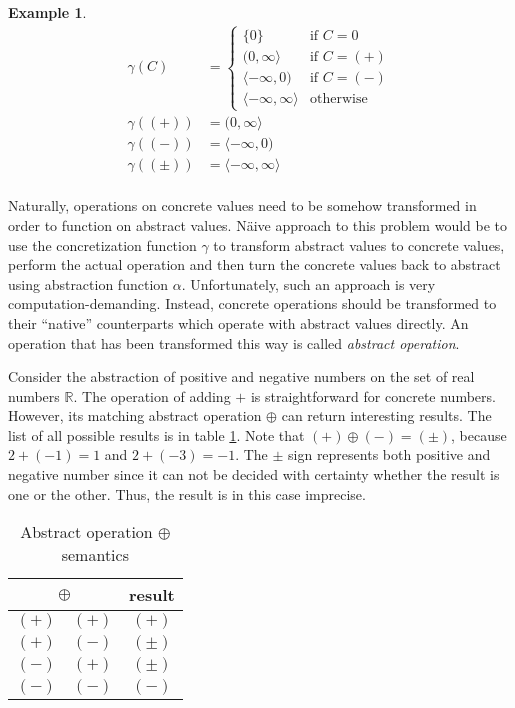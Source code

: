 \documentclass[12pt,final,oneside]{fithesis2}
\theoremstyle{definition}
\newtheorem{example}{Example}
\begin{document}
\begin{example}
\label{ex:concretizationfunc}
\begin{align*}
\gamma(C) &=
\begin{cases}
\{ 0 \} & \text{if } C = 0 \\
(0, \infty \rangle & \text{if } C = (+) \\
\langle -\infty, 0) & \text{if } C = (-) \\
\langle -\infty, \infty \rangle & \text{otherwise}
\end{cases} \\
\gamma((+)) &= (0, \infty \rangle \\
\gamma((-)) &= \langle -\infty, 0) \\
\gamma((\pm)) &= \langle -\infty, \infty \rangle \\
\end{align*}
\end{example}

Naturally, operations on concrete values need to be somehow transformed
in order to function on abstract values. N\"{a}ive approach to this problem
would be to use the concretization function $\gamma$ to transform abstract
values to concrete values, perform the actual operation and then turn the
concrete values back to abstract using abstraction function $\alpha$.
Unfortunately, such an approach is very computation-demanding. Instead,
concrete operations should be transformed to their ``native'' counterparts
which operate with abstract values directly. An operation that has been
transformed this way is called \textit{abstract operation}.

Consider the abstraction of positive and negative numbers on the set of real
numbers $\mathbb{R}$. The operation of adding $+$ is straightforward for
concrete numbers. However, its matching abstract operation $\oplus$ can
return interesting results. The list of all possible results is in
table \ref{tab:abstractplus}. Note that $(+) \oplus (-) = (\pm)$, because
$2 + (-1) = 1$ and $2 + (-3) = -1$. The $\pm$ sign represents both
positive and negative number since it can not be decided with certainty
whether the result is one or the other. Thus, the result is in this case
imprecise.

\begin{table}[ht]
\centering
\begin{tabular}{c|c|c}
\multicolumn{2}{c|}{$\oplus$} & result \\
\hline
$(+)$ & $(+)$ & $(+)$ \\
$(+)$ & $(-)$ & $(\pm)$ \\
$(-)$ & $(+)$ & $(\pm)$ \\
$(-)$ & $(-)$ & $(-)$ \\
\end{tabular}
\caption{Abstract operation $\oplus$ semantics}
\label{tab:abstractplus}
\end{table}
\end{document}
